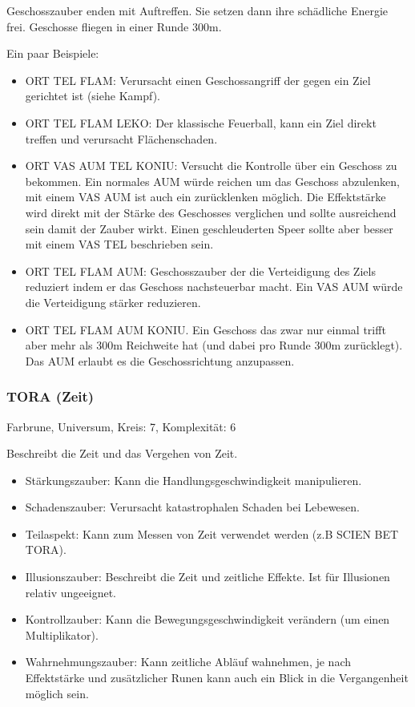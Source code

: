 \documentclass{article}
\begin{document}
Geschosszauber enden mit Auftreffen. Sie setzen dann ihre schädliche Energie frei. Geschosse fliegen in einer
Runde 300m.

Ein paar Beispiele:

\begin{itemize}
\item ORT TEL FLAM: Verursacht einen Geschossangriff der gegen ein Ziel gerichtet ist (siehe Kampf).
\item ORT TEL FLAM LEKO: Der klassische Feuerball, kann ein Ziel direkt treffen und verursacht Flächenschaden.
\item ORT VAS AUM TEL KONIU: Versucht die Kontrolle über ein Geschoss zu bekommen. Ein normales AUM würde reichen um das Geschoss abzulenken, mit einem VAS AUM ist auch ein zurücklenken möglich. Die Effektstärke wird direkt mit der Stärke des Geschosses verglichen und sollte ausreichend sein damit der Zauber wirkt. Einen geschleuderten Speer sollte aber besser mit einem VAS TEL beschrieben sein.
\item ORT TEL FLAM AUM: Geschosszauber der die Verteidigung des Ziels reduziert indem er das Geschoss nachsteuerbar macht. Ein VAS AUM würde die Verteidigung stärker reduzieren.
\item ORT TEL FLAM AUM KONIU. Ein Geschoss das zwar nur einmal trifft aber mehr als 300m Reichweite hat (und dabei pro Runde 300m zurücklegt). Das AUM erlaubt es die Geschossrichtung anzupassen.
\end{itemize}

\subsubsection{TORA (Zeit)}

Farbrune, Universum, Kreis: 7, Komplexität: 6

Beschreibt die Zeit und das Vergehen von Zeit.

\begin{itemize}
\item Stärkungszauber: Kann die Handlungsgeschwindigkeit manipulieren.
\item Schadenszauber: Verursacht katastrophalen Schaden bei Lebewesen.
\item Teilaspekt: Kann zum Messen von Zeit verwendet werden (z.B SCIEN BET TORA).
\item Illusionszauber: Beschreibt die Zeit und zeitliche Effekte. Ist für Illusionen relativ ungeeignet.
\item Kontrollzauber: Kann die Bewegungsgeschwindigkeit verändern (um einen Multiplikator).
\item Wahrnehmungszauber: Kann zeitliche Abläuf wahnehmen, je nach Effektstärke und zusätzlicher Runen kann auch ein Blick in die Vergangenheit möglich sein.
\end{itemize}
\end{document}
